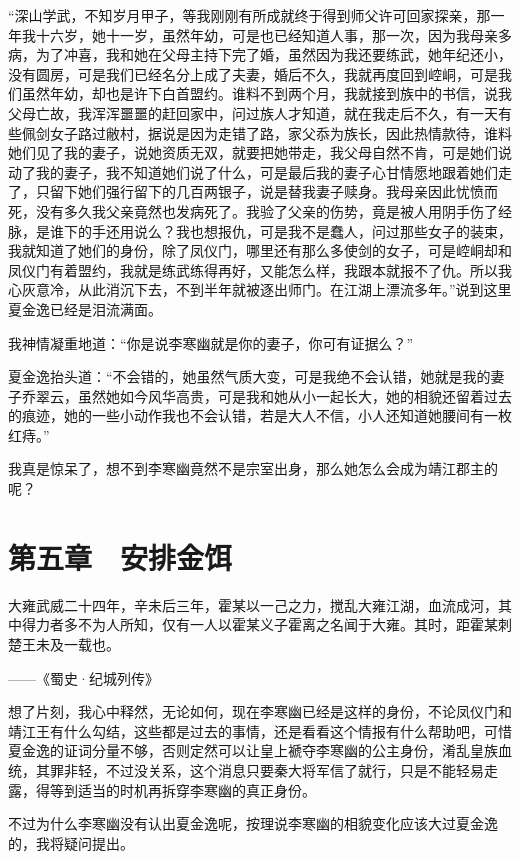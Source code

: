 “深山学武，不知岁月甲子，等我刚刚有所成就终于得到师父许可回家探亲，那一年我十六岁，她十一岁，虽然年幼，可是也已经知道人事，那一次，因为我母亲多病，为了冲喜，我和她在父母主持下完了婚，虽然因为我还要练武，她年纪还小，没有圆房，可是我们已经名分上成了夫妻，婚后不久，我就再度回到崆峒，可是我们虽然年幼，却也是许下白首盟约。谁料不到两个月，我就接到族中的书信，说我父母亡故，我浑浑噩噩的赶回家中，问过族人才知道，就在我走后不久，有一天有些佩剑女子路过敝村，据说是因为走错了路，家父忝为族长，因此热情款待，谁料她们见了我的妻子，说她资质无双，就要把她带走，我父母自然不肯，可是她们说动了我的妻子，我不知道她们说了什么，可是最后我的妻子心甘情愿地跟着她们走了，只留下她们强行留下的几百两银子，说是替我妻子赎身。我母亲因此忧愤而死，没有多久我父亲竟然也发病死了。我验了父亲的伤势，竟是被人用阴手伤了经脉，是谁下的手还用说么？我也想报仇，可是我不是蠢人，问过那些女子的装束，我就知道了她们的身份，除了凤仪门，哪里还有那么多使剑的女子，可是崆峒却和凤仪门有着盟约，我就是练武练得再好，又能怎么样，我跟本就报不了仇。所以我心灰意冷，从此消沉下去，不到半年就被逐出师门。在江湖上漂流多年。”说到这里夏金逸已经是泪流满面。

我神情凝重地道：“你是说李寒幽就是你的妻子，你可有证据么？”

夏金逸抬头道：“不会错的，她虽然气质大变，可是我绝不会认错，她就是我的妻子乔翠云，虽然她如今风华高贵，可是我和她从小一起长大，她的相貌还留着过去的痕迹，她的一些小动作我也不会认错，若是大人不信，小人还知道她腰间有一枚红痔。”

我真是惊呆了，想不到李寒幽竟然不是宗室出身，那么她怎么会成为靖江郡主的呢？

\chapter{第五章　安排金饵}

大雍武威二十四年，辛未后三年，霍某以一己之力，搅乱大雍江湖，血流成河，其中得力者多不为人所知，仅有一人以霍某义子霍离之名闻于大雍。其时，距霍某刺楚王未及一载也。

——《蜀史·纪城列传》

想了片刻，我心中释然，无论如何，现在李寒幽已经是这样的身份，不论凤仪门和靖江王有什么勾结，这些都是过去的事情，还是看看这个情报有什么帮助吧，可惜夏金逸的证词分量不够，否则定然可以让皇上褫夺李寒幽的公主身份，淆乱皇族血统，其罪非轻，不过没关系，这个消息只要秦大将军信了就行，只是不能轻易走露，得等到适当的时机再拆穿李寒幽的真正身份。

不过为什么李寒幽没有认出夏金逸呢，按理说李寒幽的相貌变化应该大过夏金逸的，我将疑问提出。

